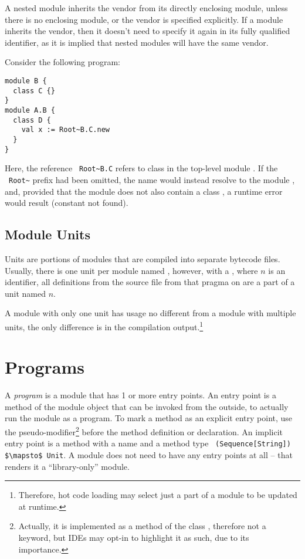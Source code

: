 A nested module inherits the vendor from its directly enclosing module, unless there is no enclosing module, or the vendor is specified explicitly. If a module inherits the vendor, then it doesn't need to specify it again in its fully qualified identifier, as it is implied that nested modules will have the same vendor. 

\example Consider the following program:
\begin{lstlisting}
module B {
  class C {}
}
module A.B {
  class D {
    val x := Root~B.C.new
  }
}
\end{lstlisting}
Here, the reference ~\lstinline!Root~B.C! refers to class  in the top-level module . If the ~\lstinline!Root~! prefix had been omitted, the name  would instead resolve to the module , and, provided that the module does not also contain a class , a runtime error would result (constant not found). 





\subsection{Module Units}
\label{sec:module-units}

Units are portions of modules that are compiled into separate bytecode files. Usually, there is one unit per module named , however, with a , where $n$ is an identifier, all definitions from the source file from that pragma on are a part of a unit named $n$. 

A module with only one unit has usage no different from a module with multiple units, the only difference is in the compilation output.\footnote{Therefore, hot code loading may select just a part of a module to be updated at runtime.}





\section{Programs}
\label{sec:programs}

A {\em program} is a module that has 1 or more entry points. An entry point is a method of the module object that can be invoked from the outside, to actually run the module as a program. To mark a method as an explicit entry point, use the  pseudo-modifier\footnote{Actually, it is implemented as a method of the class , therefore not a keyword, but IDEs may opt-in to highlight it as such, due to its importance.} before the method definition or declaration. An implicit entry point is a method with a name  and a method type ~\lstinline!(Sequence[String]) $\mapsto$ Unit!. A module does not need to have any entry points at all -- that renders it a ``library-only'' module. 

